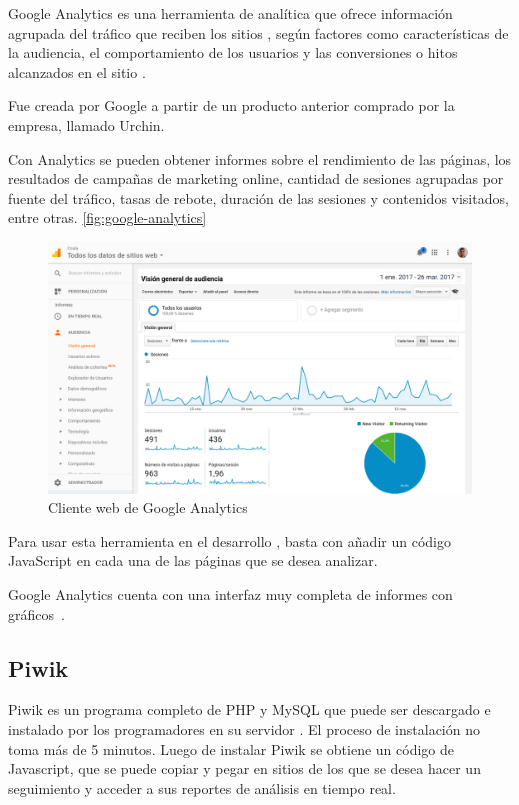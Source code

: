 Google Analytics es una herramienta de analítica  que ofrece información
agrupada del tráfico que reciben los sitios , según factores como
características de la audiencia, el comportamiento de los usuarios y las
conversiones o hitos alcanzados en el sitio .

Fue creada por Google a partir de un producto anterior comprado por la empresa,
llamado Urchin.

Con Analytics se pueden obtener informes sobre el rendimiento de las páginas,
los resultados de campañas de marketing online, cantidad de sesiones agrupadas
por fuente del tráfico, tasas de rebote, duración de las sesiones y contenidos
visitados, entre otras. \autoref{fig:google-analytics}


\begin{figure}
  \includegraphics[width=\linewidth]{src/images/anexos/google-analytics.png}
  \caption{Cliente web de Google Analytics}
  \label{fig:google-analytics}
\end{figure}

Para usar esta herramienta en el desarrollo , basta con añadir un código
JavaScript en cada una de las páginas  que se desea analizar.

Google Analytics cuenta con una interfaz muy completa de informes con
gráficos~\cite{analytics}.

\subsection{Piwik}

Piwik es un programa completo de PHP y MySQL que puede ser descargado e
instalado por los programadores en su servidor . El proceso de instalación
no toma más de 5 minutos. Luego de instalar Piwik se obtiene un código de
Javascript, que se puede copiar y pegar en sitios  de los que se desea hacer
un seguimiento y acceder a sus reportes de análisis en tiempo real.

